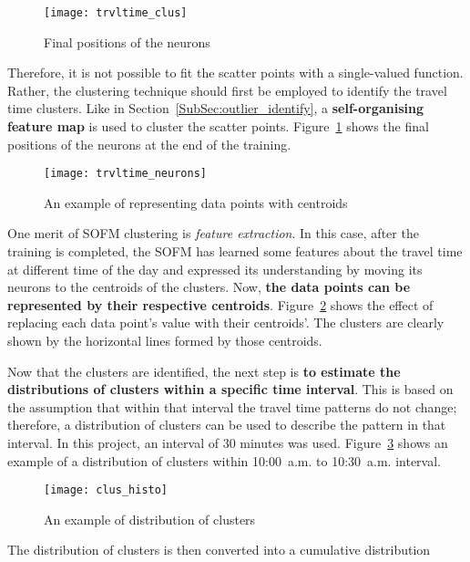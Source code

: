 \begin{figure}[h!]
\centering
\texttt{[image: trvltime\_clus]} 
\caption{Final positions of the neurons}\label{Fig:trvltime_clus}
\end{figure}

Therefore, it is not possible to fit the scatter points with a single-valued function. Rather, the clustering technique should first be employed to identify the travel time clusters. Like in Section~\ref{SubSec:outlier_identify}, a \textbf{self-organising feature map} is used to cluster the scatter points. Figure~\ref{Fig:trvltime_clus} shows the final positions of the neurons at the end of the training.

\begin{figure}[h!]
\texttt{[image: trvltime\_neurons]}
\centering
\caption{An example of representing data points with centroids}\label{Fig:trvltime_neurons}
\end{figure}

One merit of SOFM clustering is \emph{feature extraction}. In this case, after the training is completed, the SOFM has learned some features about the travel time at different time of the day and expressed its understanding by moving its neurons to the centroids of the clusters. Now, \textbf{the data points can be represented by their respective centroids}. Figure~\ref{Fig:trvltime_neurons} shows the effect of replacing each data point's value with their centroids'. The clusters are clearly shown by the horizontal lines formed by those centroids. 

Now that the clusters are identified, the next step is \textbf{to estimate the distributions of clusters within a specific time interval}. This is based on the assumption that within that interval the travel time patterns do not change; therefore, a distribution of clusters can be used to describe the pattern in that interval. In this project, an interval of 30 minutes was used. Figure~\ref{Fig:clus_histo} shows an example of a distribution of clusters within 10:00~a.m. to 10:30~a.m. interval.

\begin{figure}[h!]
\texttt{[image: clus\_histo]}
\centering
\caption{An example of distribution of clusters}\label{Fig:clus_histo}
\end{figure}

The distribution of clusters is then converted into a cumulative distribution